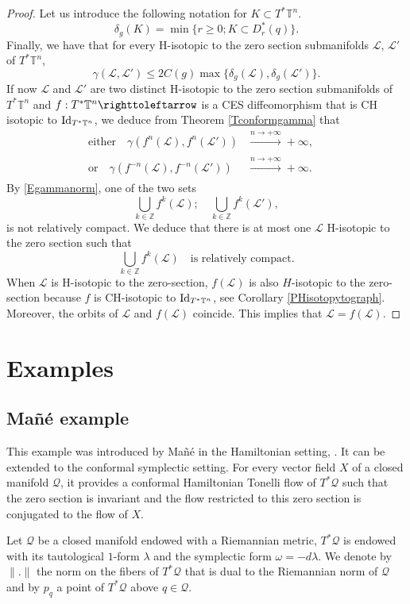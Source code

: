 \documentclass[JEP,XML,SOM,Unicode,published]{cedram}
\theoremstyle{definition}
\def\Z{\mathbb{Z}}
\def\T{\mathbb{T}}
\def\cL{{\mathcal L}}
\def\cQ{{\mathcal Q}}
\begin{document}
\begin{proof}
Let us introduce the following notation for $K\subset T^*\T^n$.
\[
\delta_g(K)=\min\{r\geq 0; K\subset D^*_r(q)\}.
\]
Finally, we have that for every H-isotopic to the zero section submanifolds $\cL$, $\cL'$ of $T^*\T^n$,
\begin{equation}\label{Egammanorm}
\gamma(\cL, \cL')\leq 2C(g)\max\{\delta_g(\cL), \delta_g(\cL')\}.
\end{equation}
If now $\cL$ and $\cL'$ are two distinct H-isotopic to the zero section submanifolds of $T^*\T^n$ and $f: T^*\T^n \righttoleftarrow$ is a CES diffeomorphism that is CH isotopic to ${\rm Id}_{T^*\T^n}$, we deduce from Theorem \ref{Tconformgamma} that
\begin{align*}
\text{either}\quad\gamma (f^n(\cL), f^n(\cL'))&\xrightarrow[]{n\to +\infty}+\infty,\quad
\\
\text{or}\quad\gamma (f^{-n}(\cL), f^{-n}(\cL'))&\xrightarrow[]{n\to +\infty}+\infty.
\end{align*}
By \eqref{Egammanorm}, one of the two sets
\[
\bigcup_{k\in\Z}f^k(\cL);\quad \bigcup_{k\in\Z}f^k(\cL'),
\]
is not relatively compact. We deduce that there is at most one $\cL$ H-isotopic to the zero section such that
\[
\bigcup_{k\in\Z}f^k(\cL)\quad\text{is relatively compact}.
\]
When $\cL$ is H-isotopic to the zero-section, $f(\cL)$ is also $H$-isotopic to the zero-section because $f$ is CH-isotopic to ${\rm Id}_{T^*\T^n}$, see Corollary \ref{PHisotopytograph}. Moreover, the orbits of $\cL$ and $f(\cL)$ coincide. This implies that $\cL=f(\cL)$.
\end{proof}

\section{Examples}\label{AExamples}

\subsection{Mañé example}\label{SecMan}

This example was introduced by Mañé in the Hamiltonian setting, \cite{Man1992}. It can be extended to the conformal symplectic setting. For every vector field $X$ of a closed manifold $\cQ$, it provides a conformal Hamiltonian Tonelli flow of $T^*\cQ$ such that the zero section is invariant and the flow restricted to this zero section is conjugated to the flow of $X$.

Let $\cQ$ be a closed manifold endowed with a Riemannian metric, $T^*\cQ$ is endowed with its tautological $1$-form $\lambda$ and the symplectic form $\omega=-d\lambda$. We denote by $\|.\|$ the norm on the fibers of $T^*\cQ$ that is dual to the Riemannian norm of $\cQ$ and by $p_q$ a point of $T^*\cQ$ above $q \in \cQ$.
\end{document}
